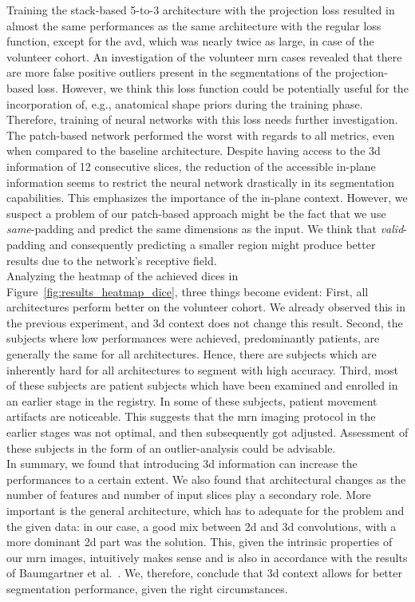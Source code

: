 Training the stack-based 5-to-3 architecture with the projection loss resulted in almost the same performances as the same architecture with the regular loss function, except for the \acrlong{avd}, which was nearly twice as large, in case of the volunteer cohort. An investigation of the volunteer \gls{mrn} cases revealed that there are more false positive outliers present in the segmentations of the projection-based loss. However, we think this loss function could be potentially useful for the incorporation of, e.g., anatomical shape priors during the training phase. Therefore, training of neural networks with this loss needs further investigation.\\
The patch-based network performed the worst with regards to all metrics, even when compared to the baseline architecture. Despite having access to the \gls{3d} information of 12 consecutive slices, the reduction of the accessible in-plane information seems to restrict the neural network drastically in its segmentation capabilities. This emphasizes the importance of the in-plane context. However, we suspect a problem of our patch-based approach might be the fact that we use \textit{same}-padding and predict the same dimensions as the input. We think that \textit{valid}-padding and consequently predicting a smaller region might produce better results due to the network's receptive field.\\
Analyzing the heatmap of the achieved \gls{dice}s in Figure~\ref{fig:results_heatmap_dice}, three things become evident: First, all architectures perform better on the volunteer cohort. We already observed this in the previous experiment, and \gls{3d} context does not change this result. Second, the subjects where low performances were achieved, predominantly patients, are generally the same for all architectures. Hence, there are subjects which are inherently hard for all architectures to segment with high accuracy. Third, most of these subjects are patient subjects which have been examined and enrolled in an earlier stage in the registry. In some of these subjects, patient movement artifacts are noticeable. This suggests that the \gls{mrn} imaging protocol in the earlier stages was not optimal, and then subsequently got adjusted. Assessment of these subjects in the form of an outlier-analysis could be advisable.\\
In summary, we found that introducing \gls{3d} information can increase the performances to a certain extent. We also found that architectural changes as the number of features and number of input slices play a secondary role. More important is the general architecture, which has to adequate for the problem and the given data: in our case, a good mix between \gls{2d} and \gls{3d} convolutions, with a more dominant \gls{2d} part was the solution. This, given the intrinsic properties of our \gls{mrn} images, intuitively makes sense and is also in accordance with the results of Baumgartner et al.~\cite{Baumgartner2017AnSegmentation}. We, therefore, conclude that \gls{3d} context allows for better segmentation performance, given the right circumstances.

